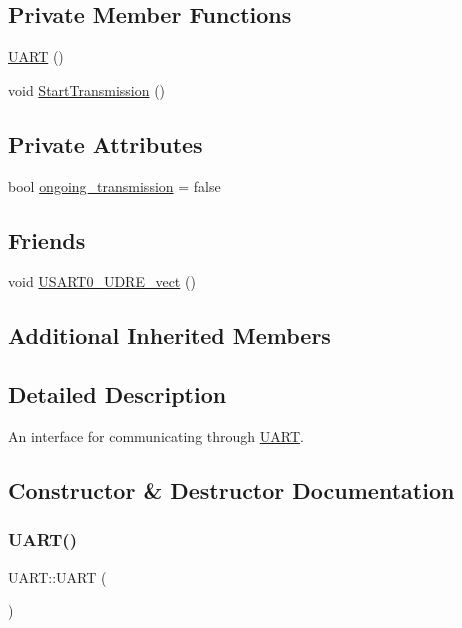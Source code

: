 \subsection*{Private Member Functions}
\begin{DoxyCompactItemize}
\item 
\hyperlink{class_u_a_r_t_a68e7e88d2a13f5da85f0fde1ef98515f}{U\+A\+RT} ()
\item 
void \hyperlink{class_u_a_r_t_a0569d0267f8045907cedb527b5082fe0}{Start\+Transmission} ()
\end{DoxyCompactItemize}
\subsection*{Private Attributes}
\begin{DoxyCompactItemize}
\item 
bool \hyperlink{class_u_a_r_t_ae98e7d277a1833478aa85dc9e686150a}{ongoing\+\_\+transmission} = false
\end{DoxyCompactItemize}
\subsection*{Friends}
\begin{DoxyCompactItemize}
\item 
void \hyperlink{class_u_a_r_t_accc13d37cd82c841e387e1d5cf4d9a94}{U\+S\+A\+R\+T0\+\_\+\+U\+D\+R\+E\+\_\+vect} ()
\end{DoxyCompactItemize}
\subsection*{Additional Inherited Members}


\subsection{Detailed Description}
An interface for communicating through \hyperlink{class_u_a_r_t}{U\+A\+RT}. 

\subsection{Constructor \& Destructor Documentation}
\hypertarget{class_u_a_r_t_a68e7e88d2a13f5da85f0fde1ef98515f}{}\label{class_u_a_r_t_a68e7e88d2a13f5da85f0fde1ef98515f} 
\subsubsection{\texorpdfstring{U\+A\+R\+T()}{UART()}\hspace{0.1cm}{\footnotesize\ttfamily [1/2]}}
{\footnotesize\ttfamily U\+A\+R\+T\+::\+U\+A\+RT (\begin{DoxyParamCaption}{ }\end{DoxyParamCaption})\hspace{0.3cm}{\ttfamily [private]}}

